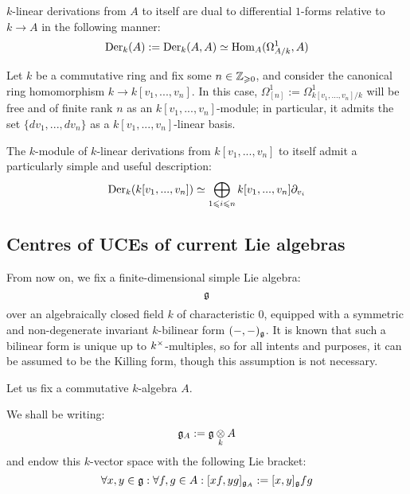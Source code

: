         \begin{corollary}
            $k$-linear derivations from $A$ to itself are dual to differential $1$-forms relative to $k \to A$ in the following manner:
                $$\mathrm{Der}_k(A) := \mathrm{Der}_k(A, A) \simeq \mathrm{Hom}_A(\Omega^1_{A/k}, A)$$
        \end{corollary}
        \begin{lemma}
            \cite[\href{https://stacks.math.columbia.edu/tag/00RX}{Tag 00RX}]{stacks} Let $k$ be a commutative ring and fix some $n \in \mathbb{Z}_{\geqslant 0}$, and consider the canonical ring homomorphism $k \to k[v_1, ..., v_n]$. In this case, $\Omega^1_{[n]} := \Omega^1_{k[v_1, ..., v_n]/k}$ will be free and of finite rank $n$ as an $k[v_1, ..., v_n]$-module; in particular, it admits the set $\{dv_1, ..., dv_n\}$ as a $k[v_1, ..., v_n]$-linear basis.
        \end{lemma}
        \begin{corollary}
            The $k$-module of $k$-linear derivations from $k[v_1, ..., v_n]$ to itself admit a particularly simple and useful description:
                $$\mathrm{Der}_k(k[v_1, ..., v_n]) \simeq \bigoplus_{1 \leqslant i \leqslant n} k[v_1, ..., v_n] \partial_{v_i}$$
        \end{corollary}

    \subsection{Centres of UCEs of current Lie algebras}
        \begin{convention} 
            From now on, we fix a finite-dimensional simple Lie algebra:
                $$\mathfrak{g}$$
            over an algebraically closed field $k$ of characteristic $0$, equipped with a symmetric and non-degenerate invariant $k$-bilinear form $(-, -)_{\mathfrak{g}}$. It is known that such a bilinear form is unique up to $k^{\x}$-multiples, so for all intents and purposes, it can be assumed to be the Killing form, though this assumption is not necessary. 
        \end{convention}

        \begin{convention}
            Let us fix a commutative $k$-algebra $A$.

            We shall be writing:
                $$\g_A := \g \tensor_k A$$
            and endow this $k$-vector space with the following Lie bracket:
                $$\forall x, y \in \mathfrak{g}: \forall f, g \in A: [x f, y g]_{\mathfrak{g}_A} := [x, y]_{\mathfrak{g}} fg$$
        \end{convention}

